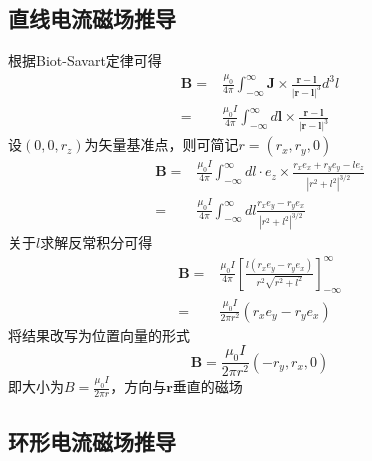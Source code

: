 \subsection{直线电流磁场推导}

根据Biot-Savart定律可得
\begin{align*}
    \mathbf{B}=&\frac{\mu_0}{4\pi}\int_{-\infty}^{\infty}\mathbf{J}\times\frac{\mathbf{r}-\mathbf{l}}{|\mathbf{r}-\mathbf{l}|^3}d^3l\\
    =&\frac{\mu_0I}{4\pi}\int_{-\infty}^{\infty}d\mathbf{l}\times\frac{\mathbf{r}-\mathbf{l}}{|\mathbf{r}-\mathbf{l}|^3}
\end{align*}
设$(0,0,r_z)$为矢量基准点，则可简记$r=(r_x,r_y,0)$
\begin{align*}
    \mathbf{B}=&\frac{\mu_0I}{4\pi}\int_{-\infty}^{\infty}dl\cdot e_z\times\frac{r_xe_x+r_ye_y-le_z}{|r^2+l^2|^{3/2}}\\
    =&\frac{\mu_0I}{4\pi}\int_{-\infty}^{\infty}dl\frac{r_xe_y-r_ye_x}{|r^2+l^2|^{3/2}}
\end{align*}
关于$l$求解反常积分可得
\begin{align*}
    \mathbf{B}=&\frac{\mu_0I}{4\pi}\left[\frac{l(r_xe_y-r_ye_x)}{r^2\sqrt{r^2+l^2}}\right]_{-\infty}^{\infty}\\
    =&\frac{\mu_0I}{2\pi r^2}(r_xe_y-r_ye_x)
\end{align*}
将结果改写为位置向量的形式
\begin{equation*}
    \mathbf{B}=\frac{\mu_0I}{2\pi r^2}(-r_y,r_x,0)
\end{equation*}
即大小为$B=\frac{\mu_0I}{2\pi r}$，方向与$\mathbf{r}$垂直的磁场

\subsection{环形电流磁场推导}

